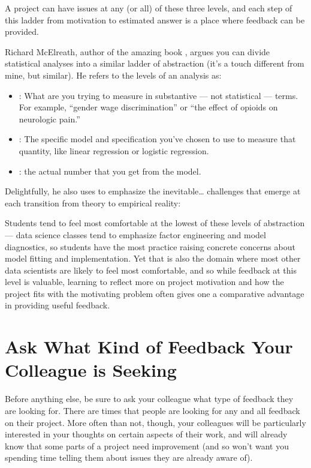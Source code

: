 \documentclass[letterpaper,10pt,english]{jupyterBook}
\begin{document}
\sphinxAtStartPar
A project can have issues at any (or all) of these three levels, and each step of this ladder from motivation to estimated answer is a place where feedback can be provided.

\sphinxAtStartPar
Richard McElreath, author of the amazing book , argues you can divide statistical analyses into a similar ladder of abstraction (it’s a touch different from mine, but similar). He refers to the levels of an analysis as:
\begin{itemize}
\item {} 
\sphinxAtStartPar
{}: What are you trying to measure in substantive — not statistical — terms. For example, “gender wage discrimination” or “the effect of opioids on neurologic pain.”

\item {} 
\sphinxAtStartPar
{}: The specific model and specification you’ve chosen to use to measure that quantity, like linear regression or logistic regression.

\item {} 
\sphinxAtStartPar
{}: the actual number that you get from the model.

\end{itemize}

\sphinxAtStartPar
Delightfully, he also uses  to emphasize the inevitable… challenges that emerge at each transition from theory to empirical reality:

\sphinxAtStartPar
{}

\sphinxAtStartPar
Students tend to feel most comfortable at the lowest of these levels of abstraction — data science classes tend to emphasize factor engineering and model diagnostics, so students have the most practice raising concrete concerns about model fitting and implementation. Yet that is also the domain where most other data scientists are likely to feel most comfortable, and so while feedback at this level is valuable, learning to reflect more on project motivation and how the project fits with the motivating problem often gives one a comparative advantage in providing useful feedback.


\section{Ask What Kind of Feedback Your Colleague is Seeking}
\label{\detokenize{40_in_practice/30_giving_feedback:ask-what-kind-of-feedback-your-colleague-is-seeking}}
\sphinxAtStartPar
Before anything else, be sure to ask your colleague what type of feedback they are looking for. There are times that people are looking for any and all feedback on their project. More often than not, though, your colleagues will be particularly interested in your thoughts on certain aspects of their work, and will already know that some parts of a project need improvement (and so won’t want you spending time telling them about issues they are already aware of).
\end{document}
